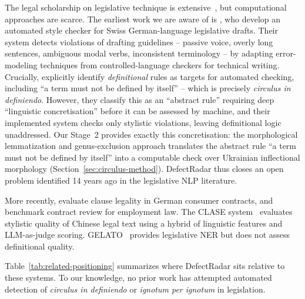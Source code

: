 \documentclass[11pt]{article}
\begin{document}
The legal scholarship on legislative technique is extensive~\citep{hart2012concept,mccormick1991interpreting,kelsen2004pure,dzeiko2007legislative,onischuk2014technique}, but computational approaches are scarce.
The earliest work we are aware of is \citet{hofler2012style}, who develop an automated style checker for Swiss German-language legislative drafts.
Their system detects violations of drafting guidelines -- passive voice, overly long sentences, ambiguous modal verbs, inconsistent terminology -- by adapting error-modeling techniques from controlled-language checkers for technical writing.
Crucially, \citeauthor{hofler2012style} explicitly identify \emph{definitional} rules as targets for automated checking, including ``a term must not be defined by itself'' -- which is precisely \emph{circulus in definiendo}.
However, they classify this as an ``abstract rule'' requiring deep ``linguistic concretisation'' before it can be assessed by machine, and their implemented system checks only stylistic violations, leaving definitional logic unaddressed.
Our Stage~2 provides exactly this concretisation: the morphological lemmatization and genus-exclusion approach translates the abstract rule ``a term must not be defined by itself'' into a computable check over Ukrainian inflectional morphology (Section~\ref{sec:circulus-method}).
DefectRadar thus closes an open problem identified 14 years ago in the legislative NLP literature.

More recently, \citet{braun2024agb} evaluate clause legality in German consumer contracts, and \citet{wardas2025employment} benchmark contract review for employment law.
The CLASE system~\citep{ma2026clase} evaluates stylistic quality of Chinese legal text using a hybrid of linguistic features and LLM-as-judge scoring.
GELATO~\citep{flynn2026gelato} provides legislative NER but does not assess definitional quality.

Table~\ref{tab:related-positioning} summarizes where DefectRadar sits relative to these systems.
To our knowledge, no prior work has attempted automated detection of \emph{circulus in definiendo} or \emph{ignotum per ignotum} in legislation.
\end{document}
